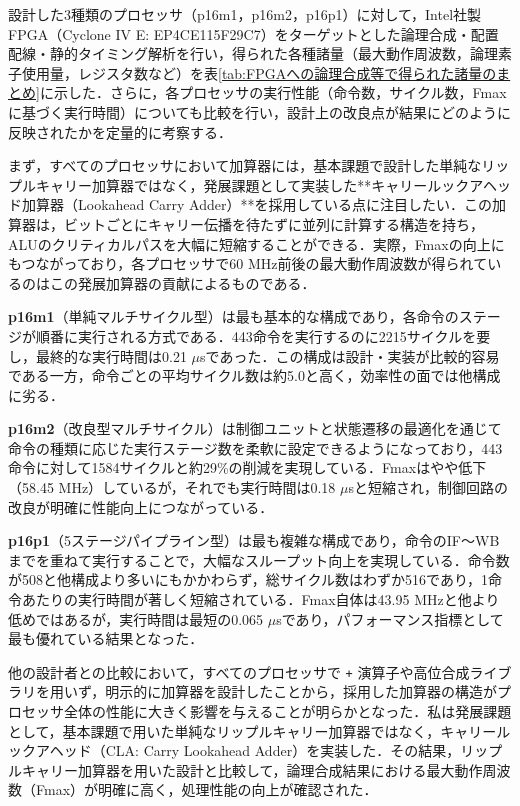 \documentclass[autodetect-engine,dvi=dvipdfmx,ja=standard,
               a4j,11pt]{bxjsarticle}
\begin{document}
設計した3種類のプロセッサ（p16m1，p16m2，p16p1）に対して，Intel社製FPGA（Cyclone IV E: EP4CE115F29C7）をターゲットとした論理合成・配置配線・静的タイミング解析を行い，得られた各種諸量（最大動作周波数，論理素子使用量，レジスタ数など）を表\ref{tab:FPGAへの論理合成等で得られた諸量のまとめ}に示した．さらに，各プロセッサの実行性能（命令数，サイクル数，Fmaxに基づく実行時間）についても比較を行い，設計上の改良点が結果にどのように反映されたかを定量的に考察する．

まず，すべてのプロセッサにおいて加算器には，基本課題で設計した単純なリップルキャリー加算器ではなく，発展課題として実装した**キャリールックアヘッド加算器（Lookahead Carry Adder）**を採用している点に注目したい．この加算器は，ビットごとにキャリー伝播を待たずに並列に計算する構造を持ち，ALUのクリティカルパスを大幅に短縮することができる．実際，Fmaxの向上にもつながっており，各プロセッサで60 MHz前後の最大動作周波数が得られているのはこの発展加算器の貢献によるものである．

\textbf{p16m1}（単純マルチサイクル型）は最も基本的な構成であり，各命令のステージが順番に実行される方式である．443命令を実行するのに2215サイクルを要し，最終的な実行時間は0.21 $\mu$sであった．この構成は設計・実装が比較的容易である一方，命令ごとの平均サイクル数は約5.0と高く，効率性の面では他構成に劣る．

\textbf{p16m2}（改良型マルチサイクル）は制御ユニットと状態遷移の最適化を通じて命令の種類に応じた実行ステージ数を柔軟に設定できるようになっており，443命令に対して1584サイクルと約29\%の削減を実現している．Fmaxはやや低下（58.45 MHz）しているが，それでも実行時間は0.18 $\mu$sと短縮され，制御回路の改良が明確に性能向上につながっている．

\textbf{p16p1}（5ステージパイプライン型）は最も複雑な構成であり，命令のIF～WBまでを重ねて実行することで，大幅なスループット向上を実現している．命令数が508と他構成より多いにもかかわらず，総サイクル数はわずか516であり，1命令あたりの実行時間が著しく短縮されている．Fmax自体は43.95 MHzと他より低めではあるが，実行時間は最短の0.065 $\mu$sであり，パフォーマンス指標として最も優れている結果となった．

他の設計者との比較において，すべてのプロセッサで \texttt{+} 演算子や高位合成ライブラリを用いず，明示的に加算器を設計したことから，採用した加算器の構造がプロセッサ全体の性能に大きく影響を与えることが明らかとなった．私は発展課題として，基本課題で用いた単純なリップルキャリー加算器ではなく，キャリールックアヘッド（CLA: Carry Lookahead Adder）を実装した．その結果，リップルキャリー加算器を用いた設計と比較して，論理合成結果における最大動作周波数（Fmax）が明確に高く，処理性能の向上が確認された．
\end{document}
